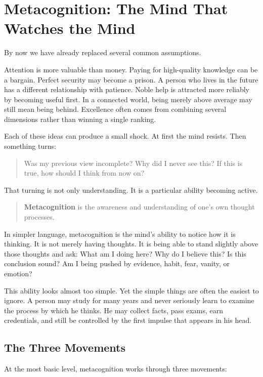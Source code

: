 \chapter{Metacognition: The Mind That Watches the Mind}

By now we have already replaced several common assumptions.

Attention is more valuable than money. Paying for high-quality knowledge can be a bargain. Perfect security may become a prison. A person who lives in the future has a different relationship with patience. Noble help is attracted more reliably by becoming useful first. In a connected world, being merely above average may still mean being behind. Excellence often comes from combining several dimensions rather than winning a single ranking.

Each of these ideas can produce a small shock. At first the mind resists. Then something turns:

\begin{quote}
Was my previous view incomplete? Why did I never see this? If this is true, how should I think from now on?
\end{quote}

That turning is not only understanding. It is a particular ability becoming active.

\begin{quote}
\textbf{Metacognition} is the awareness and understanding of one's own thought processes.
\end{quote}

In simpler language, metacognition is the mind's ability to notice how it is thinking. It is not merely having thoughts. It is being able to stand slightly above those thoughts and ask: What am I doing here? Why do I believe this? Is this conclusion sound? Am I being pushed by evidence, habit, fear, vanity, or emotion?

This ability looks almost too simple. Yet the simple things are often the easiest to ignore. A person may study for many years and never seriously learn to examine the process by which he thinks. He may collect facts, pass exams, earn credentials, and still be controlled by the first impulse that appears in his head.

\section*{The Three Movements}

At the most basic level, metacognition works through three movements:

